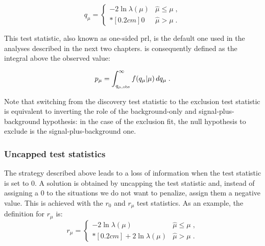 \begin{equation}
\label{eq:stat:qmu}
q_{\mu} =
\left\{ \! \! \begin{array}{ll}
               - 2 \ln \lambda(\mu)  & \hat{\mu} \le \mu  \;, \\*[0.2 cm]
               0 & \hat{\mu} > \mu \;.
              \end{array}
       \right.
\end{equation}

\noindent This test statistic, also known as one-sided \gls{prl}, is the default one used in the analyses described in the next two chapters. \pmu is consequently defined as the integral above the observed value: 

\begin{equation}
\label{eq:stat:pmu}
p_{\mu} = \int_{q_{\mu,{\rm obs}}}^{\infty} f(q_{\mu} | \mu ) \, d q_{\mu} \;.
\end{equation}

\noindent Note that switching from the discovery test statistic to the exclusion test statistic is equivalent to inverting the role of the background-only and signal-plus-background hypothesis: in the case of the exclusion fit, the null hypothesis to exclude is the signal-plus-background one.


\subsubsection*{Uncapped test statistics}

The strategy described above leads to a loss of information when the test statistic is set to 0. A solution is obtained by uncapping the test statistic and, instead of assigning a 0 to the situations we do not want to penalize, assign them a negative value. This is achieved with the $r_0$ and $r_\mu$ test statistics. As an example, the definition for $r_\mu$ is:
\begin{equation}
\label{eq:rmu}
r_{\mu} =
\left\{ \! \! \begin{array}{ll}
               - 2 \ln \lambda(\mu)  & \hat{\mu} \le \mu  \;, \\*[0.2 cm]
               + 2 \ln \lambda(\mu)  & \hat{\mu} > \mu  \;.
              \end{array}
       \right.
\end{equation}

